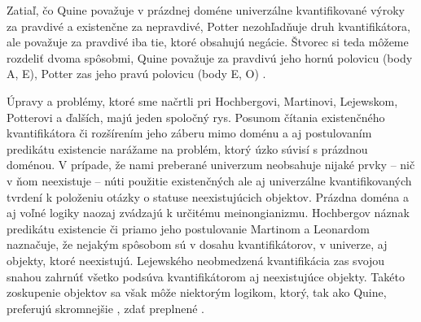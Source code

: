 \documentclass[12pt, letterpaper]{article}
\begin{document}
\noindent  Zatiaľ, čo Quine považuje v prázdnej doméne univerzálne kvantifikované výroky za pravdivé a existenčne za nepravdivé, Potter nezohľadňuje druh kvantifikátora, ale považuje za pravdivé iba tie, ktoré obsahujú negácie. Štvorec si teda môžeme rozdeliť dvoma spôsobmi, Quine považuje za pravdivú jeho hornú polovicu (body A, E), Potter zas jeho pravú polovicu (body E, O) \parencites[351--352]{englebretsen}[55]{potter}. \par Úpravy a problémy, ktoré sme načrtli pri Hochbergovi, Martinovi, Lejewskom, Potterovi a ďalších, majú jeden spoločný rys. Posunom čítania existenčného kvantifikátora či rozšírením jeho záberu mimo doménu a aj postulovaním predikátu existencie narážame na problém, ktorý úzko súvisí s prázdnou doménou. V prípade, že nami preberané univerzum neobsahuje nijaké prvky -- nič v ňom neexistuje -- núti použitie existenčných ale aj univerzálne kvantifikovaných tvrdení k položeniu otázky o statuse neexistujúcich objektov. Prázdna doména a aj voľné logiky naozaj zvádzajú k určitému meinongianizmu. Hochbergov náznak predikátu existencie či priamo jeho postulovanie Martinom a Leonardom naznačuje, že nejakým spôsobom sú v dosahu kvantifikátorov, v univerze, aj objekty, ktoré neexistujú. Lejewského neobmedzená kvantifikácia zas svojou snahou zahrnúť všetko podsúva kvantifikátorom aj neexistujúce objekty. Takéto zoskupenie objektov sa však môže niektorým logikom, ktorý, tak ako Quine, preferujú skromnejšie , zdať preplnené \parencites[23]{quineThere}.\par

\end{document}
